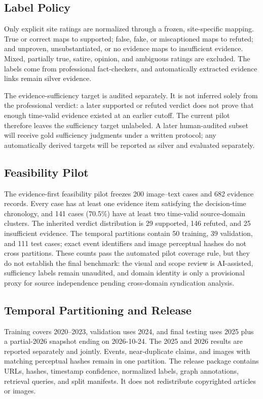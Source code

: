 \subsection{Label Policy}

Only explicit site ratings are normalized through a frozen, site-specific mapping. True or correct maps to supported; false, fake, or miscaptioned maps to refuted; and unproven, unsubstantiated, or no evidence maps to insufficient evidence. Mixed, partially true, satire, opinion, and ambiguous ratings are excluded. The labels come from professional fact-checkers, and automatically extracted evidence links remain silver evidence.

The evidence-sufficiency target is audited separately. It is not inferred solely from the professional verdict: a later supported or refuted verdict does not prove that enough time-valid evidence existed at an earlier cutoff. The current pilot therefore leaves the sufficiency target unlabeled. A later human-audited subset will receive gold sufficiency judgments under a written protocol; any automatically derived targets will be reported as silver and evaluated separately.

\subsection{Feasibility Pilot}

The evidence-first feasibility pilot freezes 200 image--text cases and 682 evidence records. Every case has at least one evidence item satisfying the decision-time chronology, and 141 cases (70.5\%) have at least two time-valid source-domain clusters. The inherited verdict distribution is 29 supported, 146 refuted, and 25 insufficient evidence. The temporal partitions contain 50 training, 39 validation, and 111 test cases; exact event identifiers and image perceptual hashes do not cross partitions. These counts pass the automated pilot coverage rule, but they do not establish the final benchmark: the visual and scope review is AI-assisted, sufficiency labels remain unaudited, and domain identity is only a provisional proxy for source independence pending cross-domain syndication analysis.

\subsection{Temporal Partitioning and Release}

Training covers 2020--2023, validation uses 2024, and final testing uses 2025 plus a partial-2026 snapshot ending on 2026-10-24. The 2025 and 2026 results are reported separately and jointly. Events, near-duplicate claims, and images with matching perceptual hashes remain in one partition. The release package contains URLs, hashes, timestamp confidence, normalized labels, graph annotations, retrieval queries, and split manifests. It does not redistribute copyrighted articles or images.

